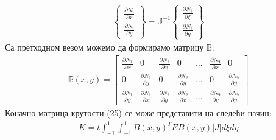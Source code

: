 \documentclass[11pt, a4paper]{article}
\begin{document}
\begin{eqnarray}
\begin{Bmatrix}
\frac{ \partial N_i}{\partial x}\\
\frac{\partial N_i}{\partial y}
\end{Bmatrix}
= \mathbb{J} ^ {-1} 
\begin{Bmatrix}
\frac{ \partial N_i}{\partial \xi}\\
\frac{\partial N_i}{\partial \eta}
\end{Bmatrix}
\end{eqnarray}
Са претходном везом можемо да формирамо матрицу $\mathbb{B}$:
\begin{eqnarray}
\mathbb{B}(x,y) = 
\begin{bmatrix}
\frac{\partial N_1}{\partial x} & 0 & \frac{\partial N_2}{\partial x} & 0 & 
 \hdots & \frac{\partial N_9}{\partial x} & 0 \\
0 & \frac{\partial N_1}{\partial y} & 0 & \frac{\partial N_2}{\partial y} & \hdots & 0 &  \frac{\partial N_9}{\partial y} \\
\frac{\partial N_1}{\partial y} & \frac{\partial N_1}{\partial x} & \frac{\partial N_2}{\partial y} &
\frac{\partial N_2}{\partial x}   & \hdots &
\frac{\partial N_9}{\partial y} & \frac{\partial N_9}{\partial y}    
\end{bmatrix}
\end{eqnarray}
Коначно матрица крутости (25) се може представити на следећи начин:
\begin{eqnarray}
K = t\int_{-1} ^1  \int_{-1} ^1 B(x,y)^T E B(x,y) |J| d \xi d \eta
\end{eqnarray}
\end{document}
